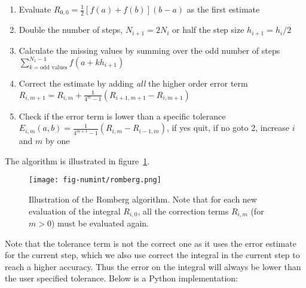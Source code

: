 \documentclass[graybox,sectrefs,envcountresetchap,open=right,final]{svmonodo}
\begin{document}
\begin{enumerate}
\item Evaluate $R_{0,0}=\frac{1}{2}\left[f(a)+f(b)\right](b-a)$ as the first estimate

\item Double the number of steps, $N_{i+1}=2N_i$ or half the step size $h_{i+1}=h_i/2$ 

\item Calculate the missing values by summing over the odd number of steps $\sum_{k=\text{odd values}}^{N_1-1}f(a+k h_{i+1})$

\item Correct the estimate by adding \emph{all} the higher order error term $R_{i,m+1}=R_{i,m}+\frac{1}{4^m-1}(R_{i+1,m+1}-R_{i,m+1})$

\item Check if the error term is lower than a specific tolerance $E_{i,m}(a,b)=\frac{1}{4^{m+1}-1}(R_{i,m}-R_{i-1,m})$, if yes quit, if no goto 2, increase $i$ and $m$ by one
\end{enumerate}

\noindent
The algorithm is illustrated in figure~\ref{fig:numint:romberg}.

\begin{figure}[!ht]  %
  \centerline{\texttt{[image: fig-numint/romberg.png]}}
  \caption{
  Illustration of the Romberg algorithm. Note that for each new evaluation of the integral $R_{i,0}$, all the correction terms $R_{i,m}$ (for $m>0$) must be evaluated again. \label{fig:numint:romberg}
  }
\end{figure}

Note that the tolerance term is not the correct one as it uses the error estimate for the current step, 
which we also use correct the integral in the current step to reach a higher accuracy. 
Thus the error on the integral will always be lower than the user specified tolerance.
Below is a Python implementation:
\end{document}
